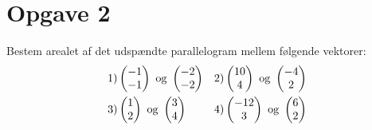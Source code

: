 \section*{Opgave 2}
Bestem arealet af det udspændte parallelogram mellem følgende vektorer:
\begin{align*}
	&1)\begin{pmatrix}-1 \\ -1\end{pmatrix} \textnormal{ og } \begin{pmatrix}-2 \\ -2\end{pmatrix} 		&&2)\begin{pmatrix}10 \\ 4\end{pmatrix} \textnormal{ og } \begin{pmatrix}-4 \\ 2\end{pmatrix}   	\\
	&3)\begin{pmatrix}1 \\ 2\end{pmatrix} \textnormal{ og } \begin{pmatrix}3 \\ 4\end{pmatrix} 		&&4)\begin{pmatrix} -12 \\ 3\end{pmatrix} \textnormal{ og } \begin{pmatrix}6 \\ 2\end{pmatrix}   	\\
\end{align*}

